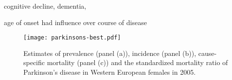 cognitive decline, dementia,

\cite{poewe_natural_2006}


age of onset had influence over course of disease


    \begin{figure}[h]
        \begin{center}
            \texttt{[image: parkinsons-best.pdf]}
            \caption{Estimates of prevalence (panel (a)), incidence (panel (b)), cause-specific mortality (panel (c)) and the standardized mortality ratio of Parkinson's disease in Western European females in 2005.}
            \label{fig:app-fruit rate type}
        \end{center}
    \end{figure} 